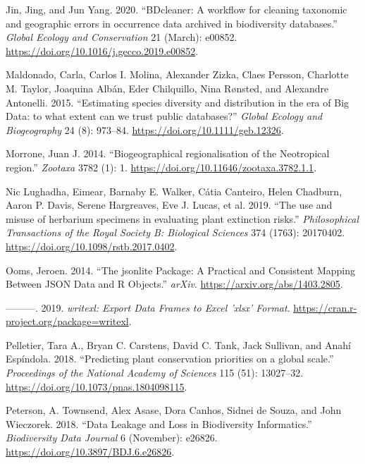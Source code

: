 \documentclass[fleqn,10pt,lineno]{wlpeerj} %
\begin{document}
\leavevmode\hypertarget{ref-Jin2020}{}%
Jin, Jing, and Jun Yang. 2020. ``BDcleaner: A workflow for cleaning taxonomic and geographic errors in occurrence data archived in biodiversity databases.'' \emph{Global Ecology and Conservation} 21 (March): e00852. \url{https://doi.org/10.1016/j.gecco.2019.e00852}.

\leavevmode\hypertarget{ref-Maldonado2015}{}%
Maldonado, Carla, Carlos I. Molina, Alexander Zizka, Claes Persson, Charlotte M. Taylor, Joaquina Albán, Eder Chilquillo, Nina Rønsted, and Alexandre Antonelli. 2015. ``Estimating species diversity and distribution in the era of Big Data: to what extent can we trust public databases?'' \emph{Global Ecology and Biogeography} 24 (8): 973--84. \url{https://doi.org/10.1111/geb.12326}.

\leavevmode\hypertarget{ref-Morrone2014}{}%
Morrone, Juan J. 2014. ``Biogeographical regionalisation of the Neotropical region.'' \emph{Zootaxa} 3782 (1): 1. \url{https://doi.org/10.11646/zootaxa.3782.1.1}.

\leavevmode\hypertarget{ref-NicLughadha2019}{}%
Nic Lughadha, Eimear, Barnaby E. Walker, Cátia Canteiro, Helen Chadburn, Aaron P. Davis, Serene Hargreaves, Eve J. Lucas, et al. 2019. ``The use and misuse of herbarium specimens in evaluating plant extinction risks.'' \emph{Philosophical Transactions of the Royal Society B: Biological Sciences} 374 (1763): 20170402. \url{https://doi.org/10.1098/rstb.2017.0402}.

\leavevmode\hypertarget{ref-Ooms2014}{}%
Ooms, Jeroen. 2014. ``The jsonlite Package: A Practical and Consistent Mapping Between JSON Data and R Objects.'' \emph{arXiv}. \url{https://arxiv.org/abs/1403.2805}.

\leavevmode\hypertarget{ref-Ooms2019}{}%
---------. 2019. \emph{writexl: Export Data Frames to Excel 'xlsx' Format}. \url{https://cran.r-project.org/package=writexl}.

\leavevmode\hypertarget{ref-Pelletier2018}{}%
Pelletier, Tara A., Bryan C. Carstens, David C. Tank, Jack Sullivan, and Anahí Espíndola. 2018. ``Predicting plant conservation priorities on a global scale.'' \emph{Proceedings of the National Academy of Sciences} 115 (51): 13027--32. \url{https://doi.org/10.1073/pnas.1804098115}.

\leavevmode\hypertarget{ref-Peterson2018}{}%
Peterson, A. Townsend, Alex Asase, Dora Canhos, Sidnei de Souza, and John Wieczorek. 2018. ``Data Leakage and Loss in Biodiversity Informatics.'' \emph{Biodiversity Data Journal} 6 (November): e26826. \url{https://doi.org/10.3897/BDJ.6.e26826}.
\end{document}
